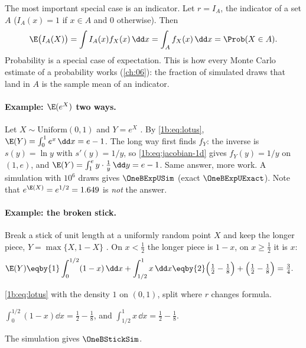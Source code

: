 The most important special case is an indicator. Let $r=I_A$, the indicator
of a set $A$ ($I_A(x)=1$ if $x\in A$ and $0$ otherwise). Then
\begin{equation}
  \E\bigl(I_A(X)\bigr)=\int I_A(x)f_X(x)\,\dd x=\int_Af_X(x)\,\dd x=\Prob(X\in A).
  \label{1b:eq:prob-as-mean}
\end{equation}
Probability is a special case of expectation. This is how every Monte Carlo
estimate of a probability works (\cref{ch:06}): the fraction of simulated
draws that land in $A$ is the sample mean of an indicator.

\paragraph{Example: $\E(e^X)$ two ways.}
Let $X\sim\mathrm{Uniform}(0,1)$ and $Y=e^X$ .
By \eqref{1b:eq:lotus}, $\E(Y)=\int_0^1e^x\,\dd x=e-1$. The long way first
finds $f_Y$: the inverse is $s(y)=\ln y$ with $s'(y)=1/y$, so
\eqref{1b:eq:jacobian-1d} gives $f_Y(y)=1/y$ on $(1,e)$, and
$\E(Y)=\int_1^e y\cdot\tfrac1y\,\dd y=e-1$. Same answer, more work. A
simulation with $10^6$ draws gives $\OneBExpUSim$ (exact $\OneBExpUExact$).
Note that $e^{\E(X)}=e^{1/2}=1.649$ is \emph{not} the answer.

\paragraph{Example: the broken stick.}
Break a stick of unit length at a uniformly random point $X$ and keep the
longer piece, $Y=\max\{X,1-X\}$ . On $x<\tfrac12$ the
longer piece is $1-x$, on $x\ge\tfrac12$ it is $x$:
\begin{align*}
  \E(Y)
  &\eqby{1} \int_0^{1/2}(1-x)\,\dd x+\int_{1/2}^1x\,\dd x
   \eqby{2} \Bigl(\tfrac12-\tfrac18\Bigr)+\Bigl(\tfrac12-\tfrac18\Bigr)
   =\tfrac34 .
\end{align*}
\begin{explain}
  \item \eqref{1b:eq:lotus} with the density $1$ on $(0,1)$, split where $r$
        changes formula.
  \item $\int_0^{1/2}(1-x)\dd x=\tfrac12-\tfrac18$, and
        $\int_{1/2}^1x\,\dd x=\tfrac12-\tfrac18$.
\end{explain}
The simulation gives $\OneBStickSim$.

